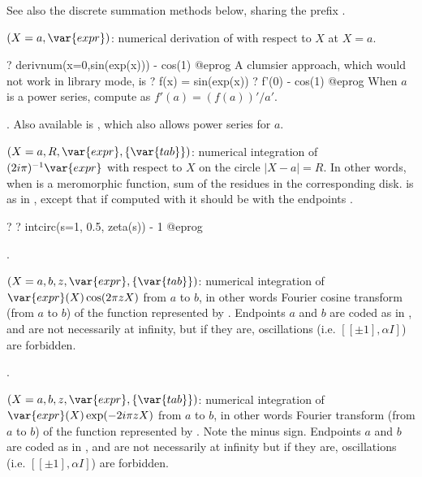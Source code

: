 See also the discrete summation methods below, sharing the prefix .


$(X=a,\var{expr})$: \label{se:derivnum}numerical derivation of  with respect to $X$ at $X=a$.

\bprog
? derivnum(x=0,sin(exp(x))) - cos(1)
@eprog
A clumsier approach, which would not work in library mode, is
\bprog
? f(x) = sin(exp(x))
? f'(0) - cos(1)
@eprog
When $a$ is a power series, compute  as $f'(a) =
(f(a))'/a'$.

. Also
available is , which also allows power series for $a$.

$(X=a,R,\var{expr},\{\var{tab}\})$: \label{se:intcirc}numerical
integration of $(2i\pi)^{-1}\var{expr}$ with respect to $X$ on the circle
$|X-a| = R$.
In other words, when  is a meromorphic
function, sum of the residues in the corresponding disk.  is as in
, except that if computed with  it should be with
the endpoints \kbd{[-1, 1]}.

\bprog
? 
? intcirc(s=1, 0.5, zeta(s)) - 1
@eprog

.

$(X=a,b,z,\var{expr},\{\var{tab}\})$: \label{se:intfouriercos}numerical
integration of $\var{expr}(X)\cos(2\pi zX)$ from $a$ to $b$, in other words
Fourier cosine transform (from $a$ to $b$) of the function represented by
. Endpoints $a$ and $b$ are coded as in , and are not
necessarily at infinity, but if they are, oscillations (i.e. $[[\pm1],\alpha
I]$) are forbidden.

.

$(X=a,b,z,\var{expr},\{\var{tab}\})$: \label{se:intfourierexp}numerical
integration of $\var{expr}(X)\exp(-2i\pi zX)$ from $a$ to $b$, in other words
Fourier transform (from $a$ to $b$) of the function represented by
. Note the minus sign. Endpoints $a$ and $b$ are coded as in
, and are not necessarily at infinity but if they are,
oscillations (i.e. $[[\pm1],\alpha I]$) are forbidden.


